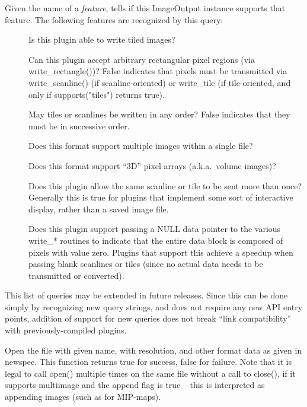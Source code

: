 Given the name of a \emph{feature}, tells if this {\kw ImageOutput} 
instance supports that feature.  The following features are recognized
by this query:
\begin{description}
\item[\spc] \spc 
\item[\rm {}] Is this plugin able to write tiled images?
\item[\rm {}] Can this plugin accept arbitrary rectangular
  pixel regions (via {\kw write_rectangle()})?  False indicates that
  pixels must be transmitted via {\kw write_scanline()} (if
  scanline-oriented) or {\kw write_tile} (if tile-oriented, and only if
  {\kw supports("tiles")} returns true).
\item[\rm {}] May tiles or scanlines be written in any
  order?  False indicates that they must be in successive order.
\item[\rm {}] Does this format support multiple images
  within a single file?
\item[\rm {}] Does this format support ``3D'' pixel arrays
  (a.k.a.\ volume images)?
\item[\rm {}] Does this plugin allow the same scanline or
  tile to be sent more than once?  Generally this is true for plugins
  that implement some sort of interactive display, rather than a saved
  image file.
\item[\rm {}] Does this plugin support passing a NULL data
  pointer to the various {\kw write_*} routines to indicate that the
  entire data block is composed of pixels with value zero.  Plugins
  that support this achieve a speedup when passing blank scanlines or
  tiles (since no actual data needs to be transmitted or converted).
\end{description}

\noindent This list of queries may be extended in future releases.
Since this can be done simply by recognizing new query strings, and does
not require any new API entry points, addition of support for new
queries does not break ``link compatibility'' with previously-compiled
plugins.
\apiend


Open the file with given {\kw name}, with resolution, and other format
data as given in {\kw newspec}.  This function returns {\kw true} for
success, {\kw false} for failure.  Note that it is legal to call {\kw
open()} multiple times on the same file without a call to {\kw
close()}, if it supports multiimage and the append flag is {\kw true}
-- this is interpreted as appending images (such as for MIP-maps).


